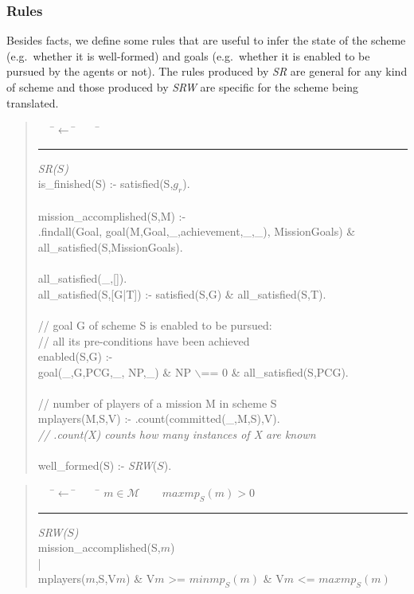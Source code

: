 \documentclass{article}
\newcommand{\andalso}{\quad\quad}
\newenvironment{rwrule}[2]
{\begin{quote}\ttfamily\begin{tabbing}~~~\=$\leftarrow$ \= ~~~ \= \kill
     \ensuremath{#2}\\
     \rule[2pt]{6.5cm}{.3pt} \hfill \rwlabel{#1}\\}
{\end{tabbing}\end{quote}}
\newcommand{\rwlabel}[1]{{\scshape\itshape\textrm{#1}}}
\theoremstyle{definition} \newtheorem{definition}{Definition}
\begin{document}
\subsubsection{Rules}

Besides facts, we define some rules that are useful to infer the state
of the scheme (e.g.\ whether it is well-formed) and goals (e.g.\
whether it is enabled to be pursued by the agents or not). The rules produced by
\rwlabel{SR} are general for any kind of scheme and those produced by
\rwlabel{SRW} are specific for the scheme being translated.
%
\begin{rwrule}{SR($S$)}
{}
is\_finished(S) :- satisfied(S,$g_r$).\\
\mbox{}\\
mission\_accomplished(S,M) :- \\
\> .findall(Goal, goal(M,Goal,\_,achievement,\_,\_), MissionGoals) \& \\
\> all\_satisfied(S,MissionGoals).\\
\mbox{}\\
all\_satisfied(\_,[]).\\
all\_satisfied(S,[G|T]) :- satisfied(S,G) \& all\_satisfied(S,T).\\
\mbox{}\\
// goal G of scheme S is enabled to be pursued:\\
// all its pre-conditions have been achieved\\
enabled(S,G) :- \\
\> goal(\_,G,PCG,\_, NP,\_) \& NP $\backslash$== 0 \& all\_satisfied(S,PCG).\\
\mbox{}\\
// number of players of a mission M in scheme S\\
mplayers(M,S,V) :-  .count(committed(\_,M,S),V).\\
  \> \textsl{\textrm{// .count(X) counts how many instances of X are known}}\\
\mbox{}\\
well\_formed(S) :- \rwlabel{SRW}($S$).\\
\end{rwrule}

\begin{rwrule}{SRW($S$)}
{m \in \mathcal{M} \andalso maxmp_S(m) > 0}
mission\_accomplished(S,$m$) \\
| \\
mplayers($m$,S,V$m$) \& V$m$ >= $minmp_S(m)$ \& V$m$ <= $maxmp_S(m)$
\end{rwrule}
\end{document}
